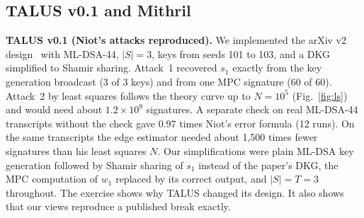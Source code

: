 \documentclass[10pt,conference,a4paper]{IEEEtran}
\begin{document}
\subsection{TALUS v0.1 and Mithril}\label{sec:mithril}
\textbf{TALUS v0.1 (Niot's attacks reproduced).} We implemented the arXiv v2 design~\cite{talus} with ML-DSA-44, $|S|=3$,
keys from seeds 101 to 103, and a DKG simplified to Shamir sharing. Attack~1 recovered $s_1$ exactly from the key
generation broadcast (3 of 3 keys) and from one MPC signature (60 of 60). Attack~2 by least squares follows the theory curve
up to $N=10^5$ (Fig.~\ref{fig:ls}) and would need about $1.2\times10^9$ signatures. A separate check on real ML-DSA-44
transcripts without the check gave 0.97 times Niot's error formula (12 runs). On the same transcripts the edge estimator
needed about 1{,}500 times fewer signatures than his least squares $N$. Our simplifications were plain ML-DSA key
generation followed by Shamir sharing of $s_1$ instead of the paper's DKG, the MPC computation of $w_1$ replaced by its
correct output, and $|S|=T=3$ throughout. The exercise shows why TALUS changed its design. It also shows that our views
reproduce a published break exactly.
\end{document}
